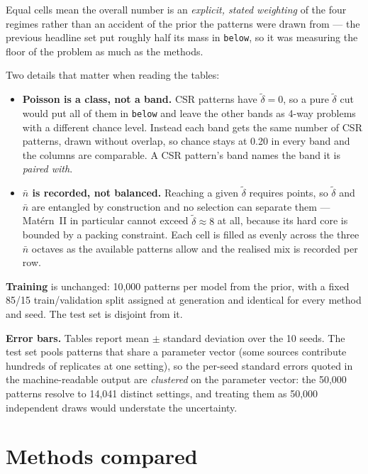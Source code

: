 \documentclass[10pt,a4paper]{article}
\newcommand{\nbar}{\bar n}
\newcommand{\dtil}{\tilde\delta}
\begin{document}
Equal cells mean the overall number is an \emph{explicit, stated weighting} of the four regimes rather than an accident of the prior the patterns were drawn from --- the previous headline set put roughly half its mass in \texttt{below}, so it was measuring the floor of the problem as much as the methods.

Two details that matter when reading the tables:
\begin{itemize}
  \item \textbf{Poisson is a class, not a band.} CSR patterns have $\dtil = 0$, so a pure $\dtil$ cut would put all of them in \texttt{below} and leave the other bands as 4-way problems with a different chance level. Instead each band gets the same number of CSR patterns, drawn without overlap, so chance stays at 0.20 in every band and the columns are comparable. A CSR pattern's band names the band it is \emph{paired with}.
  \item \textbf{$\nbar$ is recorded, not balanced.} Reaching a given $\dtil$ requires points, so $\dtil$ and $\nbar$ are entangled by construction and no selection can separate them --- Mat\'ern~II in particular cannot exceed $\dtil \approx 8$ at all, because its hard core is bounded by a packing constraint. Each cell is filled as evenly across the three $\nbar$ octaves as the available patterns allow and the realised mix is recorded per row.
\end{itemize}

\textbf{Training} is unchanged: 10{,}000 patterns per model from the prior, with a fixed 85/15 train/validation split assigned at generation and identical for every method and seed. The test set is disjoint from it.

\textbf{Error bars.} Tables report mean $\pm$ standard deviation over the 10 seeds. The test set pools patterns that share a parameter vector (some sources contribute hundreds of replicates at one setting), so the per-seed standard errors quoted in the machine-readable output are \emph{clustered} on the parameter vector: the 50{,}000 patterns resolve to 14{,}041 distinct settings, and treating them as 50{,}000 independent draws would understate the uncertainty.

\section{Methods compared}
\end{document}
